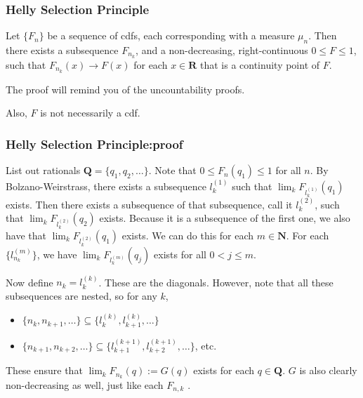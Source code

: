 \documentclass[handout]{beamer}
\begin{document}
%



\frame
{
\frametitle{Helly Selection Principle} 

\begin{Theorem} 
Let $\{F_n\}$ be a sequence of cdfs, each corresponding with a measure $\mu_n$. Then there exists a subsequence $F_{n_k}$, and a non-decreasing, right-continuous $0 \le F \le 1$, such that $F_{n_k}(x) \to F(x)$ for each $x \in \mathbf{R}$ that is a continuity point of $F$.
\end{Theorem}

The proof will remind you of the uncountability proofs. 
\newline

Also, $F$ is not necessarily a cdf.
}

\frame
{
\frametitle{Helly Selection Principle:proof} 

List out rationals $\mathbf{Q} = \{q_1, q_2,\ldots\}$. Note that $0 \le F_n(q_1) \le 1$ for all $n$. By Bolzano-Weirstrass, there exists a subsequence $l_k^{(1)}$ such that $\lim_k F_{l_k^{(1)} }(q_1)$ exists. Then there exists a subsequence of that subsequence, call it $l_k^{(2)}$, such that $\lim_k F_{l_k^{(2)} }(q_2)$ exists. Because it is a subsequence of the first one, we also have that $\lim_k F_{l_k^{(2)} }(q_1)$ exists. We can do this for each $m \in \mathbf{N}$. For each $\{l_{n_k}^{(m)} \}$, we have $\lim_k F_{l_k^{(m)} }(q_j)$ exists for all $0 < j \le m$.
\newline

Now define $n_k = l_k^{(k)}$. These are the diagonals. However, note that all these subsequences are nested, so for any $k$, 
\begin{itemize}
\item $\{n_k, n_{k+1}, \ldots\} \subseteq \{l^{(k)}_{k}, l^{(k)}_{k+1},\ldots\}  $ 
\item $\{n_{k+1}, n_{k+2}, \ldots\} \subseteq \{l^{(k+1)}_{k+1}, l^{(k+1)}_{k+2},\ldots\}  $, etc. 
\end{itemize}

These ensure that $\lim_k F_{n_k}(q) := G(q)$ exists for each $q \in \mathbf{Q}$. $G$ is also clearly non-decreasing as well, just like each $F_{n,k}$ .

}
\end{document}
